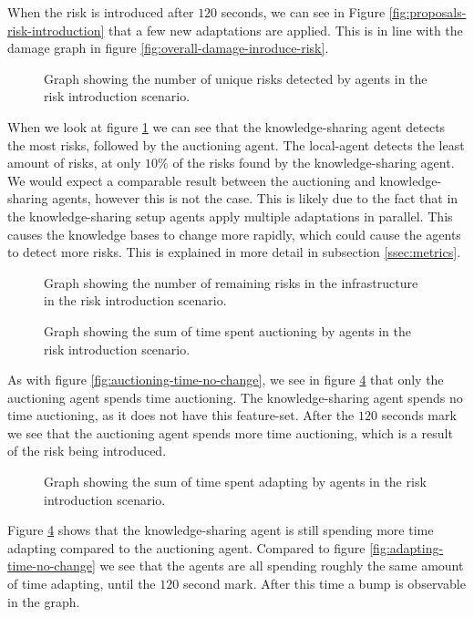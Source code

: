 When the risk is introduced after $120$ seconds, we can see in Figure \ref{fig:proposals-risk-introduction} that a few new adaptations are applied. This is in line with the damage graph in figure \ref{fig:overall-damage-inroduce-risk}.

\begin{figure}[H]
    \centering
        
    \caption{Graph showing the number of unique risks detected by agents in the risk introduction scenario.}
    \label{fig:risk-count-risk-introduction}
\end{figure}

When we look at figure \ref{fig:risk-count-risk-introduction} we can see that the knowledge-sharing agent detects the most risks, followed by the auctioning agent. The local-agent detects the least amount of risks, at only $10\%$ of the risks found by the knowledge-sharing agent. We would expect a comparable result between the auctioning and knowledge-sharing agents, however this is not the case. This is likely due to the fact that in the knowledge-sharing setup agents apply multiple adaptations in parallel. This causes the knowledge bases to change more rapidly, which could cause the agents to detect more risks. This is explained in more detail in subsection \ref{ssec:metrics}.

\begin{figure}[H]
    \centering
        
    \caption{Graph showing the number of remaining risks in the infrastructure in the risk introduction scenario.}
    \label{fig:risk-remaining-risk-introduction}
\end{figure}


\begin{figure}[H]
    \centering
        
    \caption{Graph showing the sum of time spent auctioning by agents in the risk introduction scenario.}
    \label{fig:auctioning-time-risk-introduction}
\end{figure}

As with figure \ref{fig:auctioning-time-no-change}, we see in figure \ref{fig:adapting-time-risk-introduction} that only the auctioning agent spends time auctioning. The knowledge-sharing agent spends no time auctioning, as it does not have this feature-set. After the $120$ seconds mark we see that the auctioning agent spends more time auctioning, which is a result of the risk being introduced.

\begin{figure}[H]
    \centering
        
    \caption{Graph showing the sum of time spent adapting by agents in the risk introduction scenario.}
    \label{fig:adapting-time-risk-introduction}
\end{figure}

Figure \ref{fig:adapting-time-risk-introduction} shows that the knowledge-sharing agent is still spending more time adapting compared to the auctioning agent. Compared to figure \ref{fig:adapting-time-no-change} we see that the agents are all spending roughly the same amount of time adapting, until the $120$ second mark. After this time a bump is observable in the graph.

